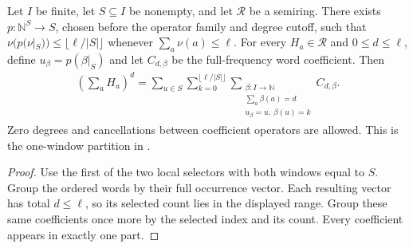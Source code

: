 \begin{theorem}
    \label{thm:one_window_word_coefficient_partition}
    \leanok
    Let $I$ be finite, let $S\subseteq I$ be nonempty, and let $\mathcal R$
    be a semiring. There exists $p:\mathbb N^S\to S$, chosen before the
    operator family and degree cutoff, such that
    $\nu(p(\nu|_S))\le\lfloor\ell/|S|\rfloor$ whenever
    $\sum_a\nu(a)\le\ell$.
    For every $H_a\in\mathcal R$ and $0\le d\le\ell$, define
    $u_\beta=p(\beta|_S)$ and let $C_{d,\beta}$ be the full-frequency
    word coefficient. Then
    \begin{align*}
        \left(\sum_aH_a\right)^d
        =\sum_{u\in S}\sum_{k=0}^{\lfloor\ell/|S|\rfloor}
        \sum_{\substack{\beta:I\to\mathbb N \\\sum_a\beta(a)=d\\
                u_\beta=u,\ \beta(u)=k}} C_{d,\beta}.
    \end{align*}
    Zero degrees and cancellations between coefficient operators are allowed.
    This is the one-window partition in \cite[Lemma~4.2]{Arad2013AreaLaw}.
\end{theorem}
\begin{proof}
    \leanok
    Use the first of the two local selectors with both windows equal to $S$.
    Group the ordered words by their full occurrence vector. Each resulting
    vector has total $d\le\ell$, so its selected count lies in the displayed
    range. Group these same coefficients once more by the selected index and
    its count. Every coefficient appears in exactly one part.
\end{proof}
